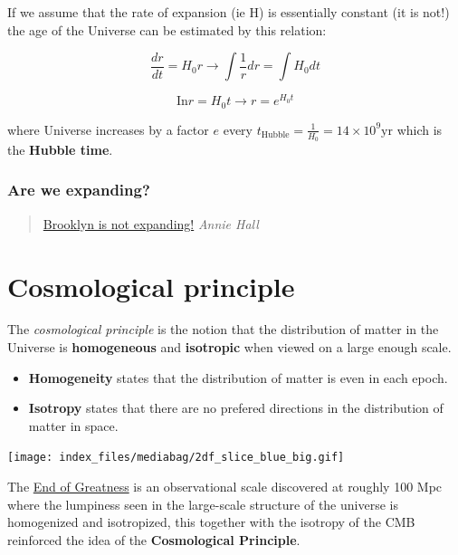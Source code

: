 \documentclass[
  letterpaper,
  DIV=11,
  numbers=noendperiod]{scrreprt}
\providecommand{\tightlist}{%
  \setlength{\itemsep}{0pt}\setlength{\parskip}{0pt}}\usepackage{longtable,booktabs,array}
\begin{document}
If we assume that the rate of expansion (ie H) is essentially constant
(it is not!) the age of the Universe can be estimated by this relation:

\[\frac{d r}{dt} = H_0 r \rightarrow \int \frac{1}{r}dr =\int H_0 dt\]

\[ \mathrm{ In} r = H_0 t \rightarrow r = e^{H_0 t}\]

where Universe increases by a factor \(e\) every
\(t_{\mathrm{Hubble}} = \frac{1}{H_0} = 14\times 10^9\mathrm{ yr}\)
which is the \textbf{Hubble time}.

\subsubsection{Are we expanding?}\label{are-we-expanding}

\begin{quote}
\href{https://www.youtube.com/watch?v=5U1-OmAICpU}{Brooklyn is not
expanding!} \emph{Annie Hall}
\end{quote}

\section{Cosmological principle}\label{cosmological-principle}

The \emph{cosmological principle} is the notion that the distribution of
matter in the Universe is \textbf{homogeneous} and \textbf{isotropic}
when viewed on a large enough scale.

\begin{itemize}
\tightlist
\item
  \textbf{Homogeneity} states that the distribution of matter is even in
  each epoch.
\item
  \textbf{Isotropy} states that there are no prefered directions in the
  distribution of matter in space.
\end{itemize}

\begin{center}
\texttt{[image: index\_files/mediabag/2df\_slice\_blue\_big.gif]}
\end{center}

The
\href{http://en.wikipedia.org/wiki/Observable_universe\#End_of_Greatness}{End
of Greatness} is an observational scale discovered at roughly 100 Mpc
where the lumpiness seen in the large-scale structure of the universe is
homogenized and isotropized, this together with the isotropy of the CMB
reinforced the idea of the \textbf{Cosmological Principle}.
\end{document}
